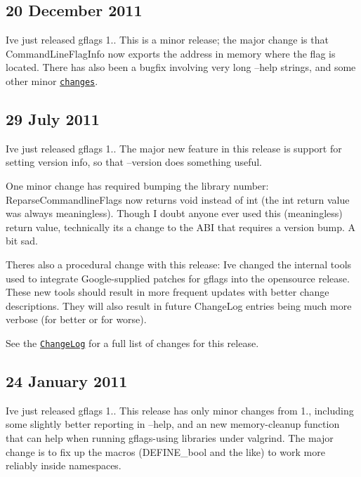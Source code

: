 \subsection*{20 December 2011 }

I\textquotesingle{}ve just released gflags 1.. This is a minor release; the major change is that {\ttfamily Command\+Line\+Flag\+Info} now exports the address in memory where the flag is located. There has also been a bugfix involving very long --help strings, and some other minor \href{ChangeLog.txt}{\tt changes}.

\subsection*{29 July 2011 }

I\textquotesingle{}ve just released gflags 1.. The major new feature in this release is support for setting version info, so that --version does something useful.

One minor change has required bumping the library number\+: {\ttfamily Reparse\+Commandline\+Flags} now returns {\ttfamily void} instead of {\ttfamily int} (the int return value was always meaningless). Though I doubt anyone ever used this (meaningless) return value, technically it\textquotesingle{}s a change to the A\+BI that requires a version bump. A bit sad.

There\textquotesingle{}s also a procedural change with this release\+: I\textquotesingle{}ve changed the internal tools used to integrate Google-\/supplied patches for gflags into the opensource release. These new tools should result in more frequent updates with better change descriptions. They will also result in future {\ttfamily Change\+Log} entries being much more verbose (for better or for worse).

See the \href{ChangeLog.txt}{\tt Change\+Log} for a full list of changes for this release.

\subsection*{24 January 2011 }

I\textquotesingle{}ve just released gflags 1.. This release has only minor changes from 1., including some slightly better reporting in --help, and an new memory-\/cleanup function that can help when running gflags-\/using libraries under valgrind. The major change is to fix up the macros ({\ttfamily D\+E\+F\+I\+N\+E\+\_\+bool} and the like) to work more reliably inside namespaces.

